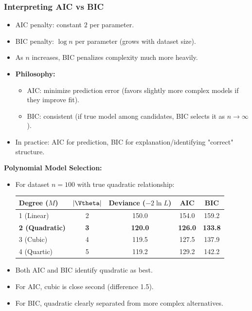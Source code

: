 \subsubsection*{Interpreting AIC vs BIC}

\begin{itemize}
    \item AIC penalty: constant $2$ per parameter.
    \item BIC penalty: $\log n$ per parameter (grows with dataset size).
    \item As $n$ increases, BIC penalizes complexity much more heavily.
    \item \textbf{Philosophy:}
    \begin{itemize}
        \item AIC: minimize prediction error (favors slightly more complex models if they improve fit).
        \item BIC: consistent (if true model among candidates, BIC selects it as $n \to \infty$).
    \end{itemize}
    \item In practice: AIC for prediction, BIC for explanation/identifying "correct" structure.
\end{itemize}

\begin{myexample}
\textbf{Polynomial Model Selection:}
\begin{itemize}
    \item For dataset $n=100$ with true quadratic relationship:
    \begin{center}
    \begin{tabular}{|l|c|c|c|c|}
    \hline
    \textbf{Degree ($M$)} & \textbf{$|\Vtheta|$} & \textbf{Deviance ($-2\ln L$)} & \textbf{AIC} & \textbf{BIC} \\
    \hline
    1 (Linear) & 2 & 150.0 & 154.0 & 159.2 \\
    \textbf{2 (Quadratic)} & \textbf{3} & \textbf{120.0} & \textbf{126.0} & \textbf{133.8} \\
    3 (Cubic) & 4 & 119.5 & 127.5 & 137.9 \\
    4 (Quartic) & 5 & 119.2 & 129.2 & 142.2 \\
    \hline
    \end{tabular}
    \end{center}
    \item Both AIC and BIC identify quadratic as best.
    \item For AIC, cubic is close second (difference 1.5).
    \item For BIC, quadratic clearly separated from more complex alternatives.
\end{itemize}
\end{myexample}

